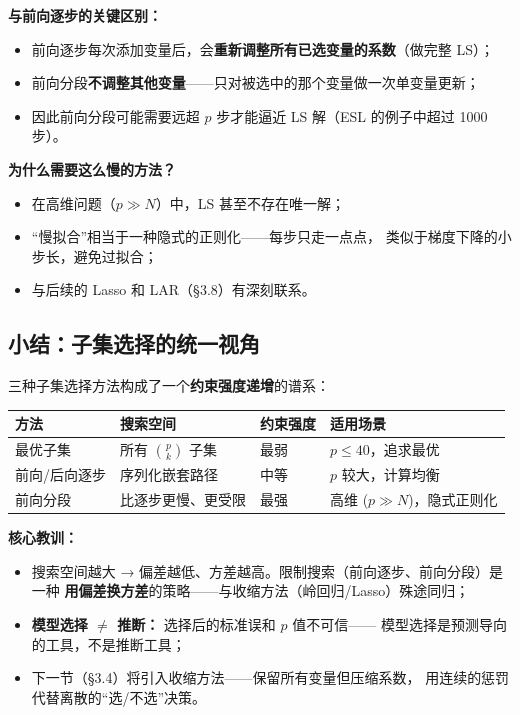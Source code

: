 \textbf{与前向逐步的关键区别：}
\begin{itemize}
    \item 前向逐步每次添加变量后，会\textbf{重新调整所有已选变量的系数}（做完整 LS）；
    \item 前向分段\textbf{不调整其他变量}——只对被选中的那个变量做一次单变量更新；
    \item 因此前向分段可能需要远超 $p$ 步才能逼近 LS 解（ESL 的例子中超过 1000 步）。
\end{itemize}

\textbf{为什么需要这么慢的方法？}
\begin{itemize}
    \item 在高维问题（$p \gg N$）中，LS 甚至不存在唯一解；
    \item ``慢拟合''相当于一种隐式的正则化——每步只走一点点，
    类似于梯度下降的小步长，避免过拟合；
    \item 与后续的 Lasso 和 LAR（§3.8）有深刻联系。
\end{itemize}

\subsection{小结：子集选择的统一视角}

三种子集选择方法构成了一个\textbf{约束强度递增}的谱系：

\begin{center}
\renewcommand{\arraystretch}{1.4}
\begin{tabular}{p{2.5cm}|p{4cm}|p{3cm}|p{5cm}}
\toprule
\textbf{方法} & \textbf{搜索空间} & \textbf{约束强度} & \textbf{适用场景} \\
\midrule
最优子集        & 所有 $\binom{p}{k}$ 子集  & 最弱 & $p \le 40$，追求最优 \\
前向/后向逐步  & 序列化嵌套路径            & 中等 & $p$ 较大，计算均衡 \\
前向分段        & 比逐步更慢、更受限        & 最强 & 高维 ($p \gg N$)，隐式正则化 \\
\bottomrule
\end{tabular}
\end{center}

\textbf{核心教训：}
\begin{itemize}
    \item 搜索空间越大 → 偏差越低、方差越高。限制搜索（前向逐步、前向分段）是一种
    \textbf{用偏差换方差}的策略——与收缩方法（岭回归/Lasso）殊途同归；
    \item \textbf{模型选择 $\neq$ 推断：} 选择后的标准误和 $p$ 值不可信——
    模型选择是预测导向的工具，不是推断工具；
    \item 下一节（§3.4）将引入收缩方法——保留所有变量但压缩系数，
    用连续的惩罚代替离散的``选/不选''决策。
\end{itemize}


